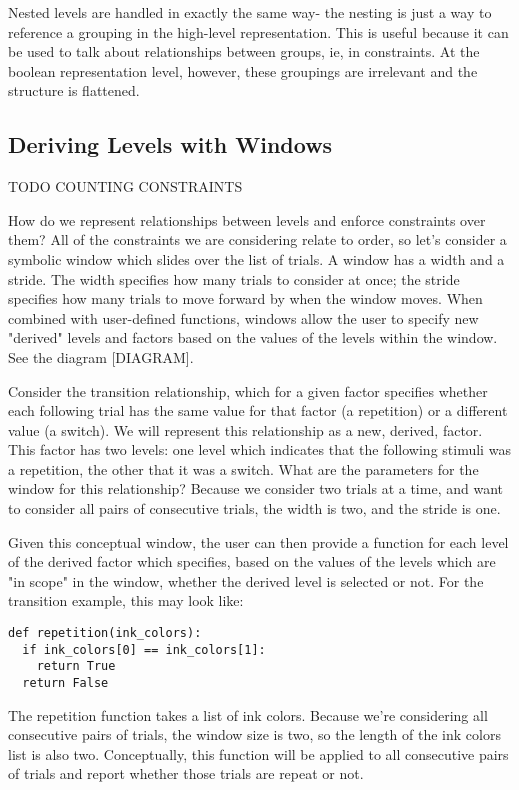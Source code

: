 Nested levels are handled in exactly the same way- the nesting is just a way to reference a grouping in the high-level representation. This is useful because it can be used to talk about relationships between groups, ie, in constraints. At the boolean representation level, however, these groupings are irrelevant and the structure is flattened.

\subsection{Deriving Levels with Windows}

TODO COUNTING CONSTRAINTS

How do we represent relationships between levels and enforce constraints over them? All of the constraints we are considering relate to order, so let's consider a symbolic window which slides over the list of trials. A window has a width and a stride. The width specifies how many trials to consider at once; the stride specifies how many trials to move forward by when the window moves. When combined with user-defined functions, windows allow the user to specify new "derived" levels and factors based on the values of the levels within the window. See the diagram [DIAGRAM].

Consider the transition relationship, which for a given factor specifies whether each following trial has the same value for that factor (a repetition) or a different value (a switch). We will represent this relationship as a new, derived, factor. This factor has two levels: one level which indicates that the following stimuli was a repetition, the other that it was a switch. What are the parameters for the window for this relationship? Because we consider two trials at a time, and want to consider all pairs of consecutive trials, the width is two, and the stride is one.

Given this conceptual window, the user can then provide a function for each level of the derived factor which specifies, based on the values of the levels which are "in scope" in the window, whether the derived level is selected or not. For the transition example, this may look like:

\begin{lstlisting}
def repetition(ink_colors):
  if ink_colors[0] == ink_colors[1]:
    return True
  return False
\end{lstlisting}

The repetition function takes a list of ink colors. Because we're considering all consecutive pairs of trials, the window size is two, so the length of the ink colors list is also two. Conceptually, this function will be applied to all consecutive pairs of trials and report whether those trials are repeat or not.

